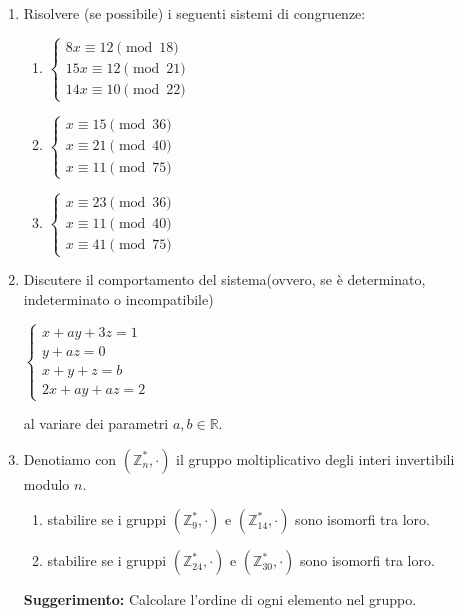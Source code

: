 \documentclass[fleqn]{article}
\begin{document}
\begin{enumerate}
   \item Risolvere (se possibile) i seguenti sistemi di congruenze:
   
   \begin{enumerate} 
      \item \begin{center} 
      $ \begin{cases}
         8x \equiv 12 \pmod{18} \\
         15x \equiv 12 \pmod{21} \\
         14x \equiv 10 \pmod{22} 
      \end{cases} $
      \end{center}
      \item \begin{center} 
      $ \begin{cases}
         x \equiv 15 \pmod{36} \\
         x \equiv 21 \pmod{40} \\
         x \equiv 11 \pmod{75} 
      \end{cases} $
      \end{center}
      \item \begin{center}
      $ \begin{cases}
         x \equiv 23 \pmod{36} \\
         x \equiv 11 \pmod{40} \\
         x \equiv 41 \pmod{75} 
      \end{cases} $
      \end{center}
   \end{enumerate}

   \item Discutere il comportamento del sistema(ovvero, se è determinato, indeterminato o incompatibile)
   \begin{center}
   $\begin{cases} 
      x + ay + 3z = 1 \\
      y + az = 0 \\
      x + y + z = b \\
      2x + ay + az = 2
   \end{cases}$ \\
   \end{center}
   al variare dei parametri $a,b \in \mathbb{R}$.
   \item Denotiamo con $(\mathbb{Z}_n^*, \cdot)$ il gruppo moltiplicativo degli interi invertibili modulo $n$.
   \begin{enumerate}
    \item stabilire se i gruppi $(\mathbb{Z}_9^*, \cdot)$ e $(\mathbb{Z}_{14}^*, \cdot)$ sono isomorfi tra loro.
    \item stabilire se i gruppi $(\mathbb{Z}_{24}^*, \cdot)$ e $(\mathbb{Z}_{30}^*, \cdot)$ sono isomorfi tra loro.
   \end{enumerate}   
   \textbf{Suggerimento:} Calcolare l'ordine di ogni elemento nel gruppo.


\end{enumerate}
\end{document}

